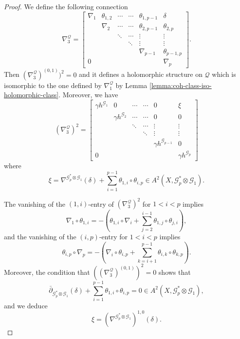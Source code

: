 \documentclass[english,reqno]{amsart}
\newcommand\sG{{\mathscr G}}
\newcommand\sQ{{\mathscr Q}}
\newcommand\bp{{\bar\partial}}
\theoremstyle{plain}
\theoremstyle{definition}
\numberwithin{equation}{section} %
\begin{document}
\begin{proof}
    We define the following connection
    \[
    \nabla^{\sQ}_3 =
    \begin{bmatrix}
    \nabla_1 & \theta_{1,2} & \cdots & \cdots & \theta_{1,p-1} & \delta \\
    & \nabla_2  & \cdots & \cdots& \theta_{2,p-1} & \theta_{2,p} \\
    & &\ddots & \cdots & \vdots & \vdots \\
    & & & \ddots & \vdots & \vdots \\
    & & & & \nabla_{p-1} & \theta_{p-1,p} \\
    0 & & & & & \nabla_p
    \end{bmatrix}.
    \]
    Then $(\nabla^{\sQ}_3)^{(0,1)})^2=0$ and it defines a holomorphic structure on $\sQ$ which is isomorphic to the one defined by $\nabla^\sQ_1$ by Lemma \ref{lemma:coh-class-iso-holomorphic-class}.
    Moreover, we have
    \[
    (\nabla^{\sQ}_3)^2  =
    \begin{bmatrix}
    \gamma h^{\sG_1} &  0 & \cdots & \cdots & 0 & \xi \\
    & \gamma h^{\sG_2} & \cdots & \cdots& 0 & 0 \\
    & &\ddots & \cdots & \vdots & \vdots \\
    & & & \ddots & \vdots & \vdots \\
    & & & & \gamma h^{\sG_{p-1}} &  0 \\
    0 & & & & & \gamma h^{\sG_p}
    \end{bmatrix}
    \]
    where
    $$\xi= \nabla^{\sG_p^*\otimes \sG_1}(\delta) + \sum_{i=1}^{p-1}\theta_{1,i}\circ \theta_{i,p} \in A^{2}(X,\sG_p^*\otimes \sG_1).$$




   \noindent The vanishing of the $(1,i)$-entry  of  $(\nabla^{\sQ}_3)^2$ for $1<i<p$ implies
    \begin{equation}\label{eq-vansh-1}
    \nabla_1 \circ \theta_{1,i} = - (\theta_{1,i} \circ \nabla_i + \sum_{j=2}^{i-1} \theta_{1,j}\circ \theta_{j,i}),
    \end{equation}
    and the  vanishing of the $(i,p)$-entry  for $1<i<p$ implies
    \begin{equation}\label{eq-vansh-2}
    \theta_{i,p} \circ \nabla_p = -(\nabla_i \circ \theta_{i,p}  + \sum_{k=i+1}^{p-1} \theta_{i,k} \circ \theta_{k,p}).
    \end{equation}
    Moreover, the condition that $((\nabla^{\sQ}_3)^{(0,1)})^2=0$ shows that
    \begin{equation}\label{eq-vansh-3}
    \bp_{\sG_p^*\otimes \sG_1}(\delta) + \sum_{i=1}^{p-1}\theta_{1,i}\circ \theta_{i,p} =0 \in A^{2}(X,\sG_p^*\otimes \sG_1),
    \end{equation}
    and we deduce
    \begin{equation}\label{eq-vansh-4}
    \xi = (\nabla^{\sG_p^*\otimes \sG_1})^{1,0}(\delta).
    \end{equation}


\end{proof}
\end{document}
